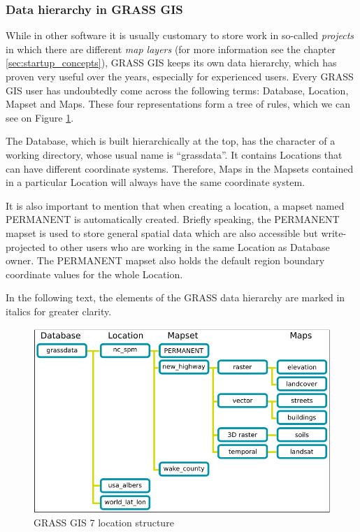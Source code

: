 \documentclass[a4paper,10pt,twoside]{article}
\begin{document}
\subsubsection{Data hierarchy in GRASS GIS}
\label{subsection:hierarchy}
\noindent
\large

\noindent While in other software it is usually customary to store work in so-called \textit{projects} in which there are different \textit{map layers} (for more information see the chapter \ref{sec:startup_concepts}), GRASS GIS keeps its own data hierarchy, which has proven very useful over the years, especially for experienced users. Every GRASS GIS user has undoubtedly come across the following terms: Database, Location, Mapset and Maps. These four representations form a tree of rules, which we can see on Figure \ref{fig:grass_data_hierarchy}.

The Database, which is built hierarchically at the top, has the character of a working directory, whose usual name is ``grassdata''. It contains Locations that can have different coordinate systems. Therefore, Maps in the Mapsets contained in a particular Location will always have the same coordinate system.

It is also important to mention that when creating a location, a mapset named PERMANENT is automatically created. Briefly speaking, the PERMANENT mapset is used to store general spatial data which are also accessible but write-projected to other users who are working in the same Location as Database owner. The PERMANENT mapset also holds the default region boundary coordinate values for the whole Location.

In the following text, the elements of the GRASS data hierarchy are marked in italics for greater clarity.

\vspace{0.3cm}
\begin{figure}[hbt!]
\begin{center}
\includegraphics[width=14cm]{../pictures/grass_data_hiearchy.png} 
\caption[GRASS GIS 7 location structure]{GRASS GIS 7 location structure}
\label{fig:grass_data_hierarchy}
\end{center}
\end{figure}
\end{document}
